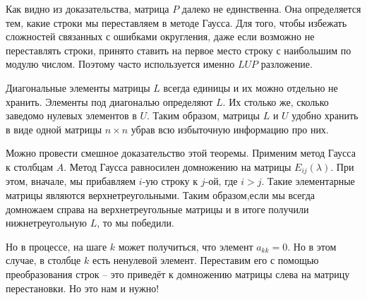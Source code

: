 \rm Как видно из доказательства, матрица $P$ далеко не единственна. Она определяется тем, какие строки мы переставляем в методе Гаусса. Для того, чтобы избежать сложностей связанных с ошибками округления, даже если возможно не переставлять строки, принято ставить на первое место строку с наибольшим по модулю числом.
Поэтому часто используется именно $LUP$ разложение.
\erm

\rm  Диагональные элементы матрицы $L$ всегда единицы и их можно отдельно не хранить. Элементы под диагональю определяют $L$. Их столько же, сколько заведомо нулевых элементов в $U$. Таким образом, матрицы $L$ и $U$ удобно хранить в виде одной матрицы $n\times n$ убрав всю избыточную информацию про них.
\erm


\rm Можно провести смешное доказательство этой теоремы. Применим метод Гаусса к столбцам $A$. Метод Гаусса равносилен домножению на матрицы $E_{ij}(\lambda)$. При этом, вначале, мы прибавляем $i$-ую строку к $j$-ой, где $i>j$. Такие элементарные матрицы являются верхнетреугольными. Таким образом,если мы всегда домножаем справа на верхнетреугольные матрицы и в итоге получили нижнетреугольную $L$, то мы победили. 

Но в процессе, на шаге $k$   может  получиться, что элемент $a_{kk}=0$. Но в этом случае, в столбце $k$ есть ненулевой элемент. Переставим его с помощью преобразования строк -- это приведёт к домножению матрицы слева на матрицу перестановки. Но это нам и нужно!
\erm



















